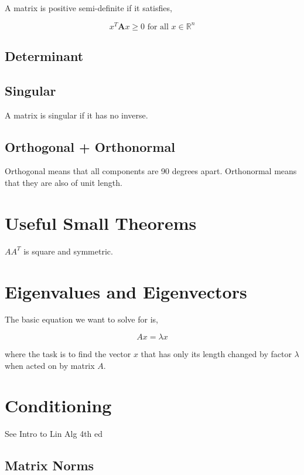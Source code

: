 \documentclass{article}
\begin{document}
\noindent
A matrix is positive semi-definite if it satisfies,

\begin{equation}
    x^T \boldsymbol{A} x \geq 0 \text{ for all } x \in \mathbb{R}^n
\end{equation}

\subsection{Determinant}
\subsection{Singular}

A matrix is singular if it has no inverse.

\subsection{Orthogonal + Orthonormal}

Orthogonal means that all components are 90 degrees apart.
Orthonormal means that they are also of unit length.

\section{Useful Small Theorems}

$A A^T$ is square and symmetric.

\section{Eigenvalues and Eigenvectors}

The basic equation we want to solve for is,

$$Ax = \lambda x$$

where the task is to find the vector $x$ that has only its length changed by factor $\lambda$ when acted on by matrix $A$.



\section{Conditioning}

See Intro to Lin Alg 4th ed

\subsection{Matrix Norms}
\end{document}
